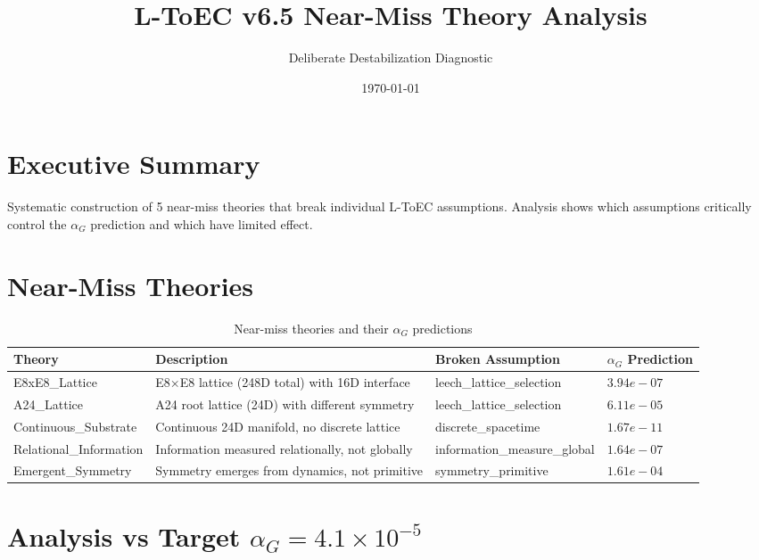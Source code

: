 \documentclass[11pt]{article}
\title{L-ToEC v6.5 Near-Miss Theory Analysis}
\author{Deliberate Destabilization Diagnostic}
\date{\today}
\begin{document}
\maketitle

\section*{Executive Summary}

Systematic construction of 5 near-miss theories that break individual L-ToEC
assumptions. Analysis shows which assumptions critically control the
$\alpha_G$ prediction and which have limited effect.

\section{Near-Miss Theories}

\begin{table}[h!]
\centering
\begin{tabular}{p{}p{}p{}p{}}
\toprule
\textbf{Theory} & \textbf{Description} & \textbf{Broken Assumption} & \textbf{$\alpha_G$ Prediction} \\
\midrule
E8xE8\_Lattice & E8×E8 lattice (248D total) with 16D interface & leech\_lattice\_selection & $3.94e-07$ \\
\midrule
A24\_Lattice & A24 root lattice (24D) with different symmetry & leech\_lattice\_selection & $6.11e-05$ \\
\midrule
Continuous\_Substrate & Continuous 24D manifold, no discrete lattice & discrete\_spacetime & $1.67e-11$ \\
\midrule
Relational\_Information & Information measured relationally, not globally & information\_measure\_global & $1.64e-07$ \\
\midrule
Emergent\_Symmetry & Symmetry emerges from dynamics, not primitive & symmetry\_primitive & $1.61e-04$ \\
\bottomrule
\end{tabular}
\caption{Near-miss theories and their $\alpha_G$ predictions}
\end{table}

\section{Analysis vs Target $\alpha_G = 4.1\times 10^{-5}$}
\end{document}
